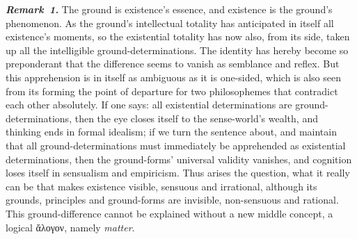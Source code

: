 \documentclass[12pt]{book}
\newcommand{\anm}[1]{\emph{\textbf{Remark~#1.}}}
\begin{document}
\anm{1} The ground is existence's essence, and existence is the ground's
phenomenon. As the ground's intellectual totality has anticipated in itself
all existence's moments, so the existential totality has now also, from its
side, taken up all the intelligible ground-determinations. The identity has
hereby become so preponderant that the difference seems to vanish as
semblance and reflex. But this apprehension is in itself as ambiguous as it
is one-sided, which is also seen from its forming the point of departure for
two philosophemes that contradict each other absolutely. If one says: all
existential determinations are ground-determinations, then the eye closes
itself to the sense-world's wealth, and thinking ends in formal idealism; if
we turn the sentence about, and maintain that all ground-determinations must
immediately be apprehended as existential determinations, then the
ground-forms' universal validity vanishes, and cognition loses itself in
sensualism and empiricism. Thus arises the question, what it really can be
that makes existence visible, sensuous and irrational, although its grounds,
principles and ground-forms are invisible, non-sensuous and rational. This
ground-difference cannot be explained without a new middle concept, a
logical ἄλογον, namely \emph{matter}.
\end{document}
